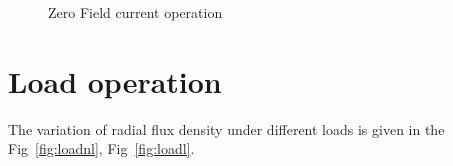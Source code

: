 \documentclass[a4paper,11pt]{article}
\begin{document}
\begin{figure}[h!]
  \centering
  \quad
  \caption{Zero Field current operation}
\end{figure}

\section{Load operation}
The variation of radial flux density under different loads is given in the Fig~\ref{fig:loadnl}, Fig~\ref{fig:loadl}.
\end{document}
